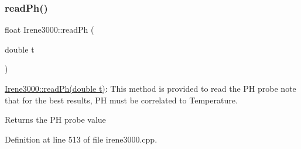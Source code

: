 \subsubsection{\texorpdfstring{read\+Ph()}{readPh()}}
{\footnotesize\ttfamily float Irene3000\+::read\+Ph (\begin{DoxyParamCaption}\item[{double}]{t }\end{DoxyParamCaption})}

\hyperlink{class_irene3000_a436fc0a06681cd0784aba56b9707f19a}{Irene3000\+::read\+Ph(double t)}\+: This method is provided to read the PH probe note that for the best results, PH must be correlated to Temperature.

\begin{DoxyReturn}{Returns}
the PH probe value 
\end{DoxyReturn}


Definition at line 513 of file irene3000.\+cpp.


